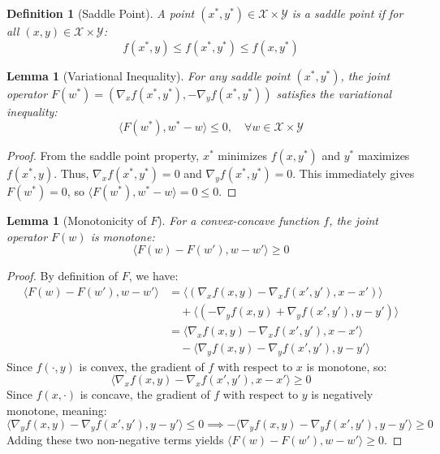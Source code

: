 \documentclass{article}
\newtheorem{lemma}[theorem]{Lemma}
\newtheorem{definition}{Definition}
\begin{document}
\begin{definition}[Saddle Point]
A point $(x^*, y^*) \in \mathcal{X} \times \mathcal{Y}$ is a saddle point if for all $(x,y) \in \mathcal{X} \times \mathcal{Y}$:
$$ f(x^*, y) \leq f(x^*, y^*) \leq f(x, y^*) $$
\end{definition}

\begin{lemma}[Variational Inequality]
For any saddle point $(x^*, y^*)$, the joint operator $F(w^*) = (\nabla_x f(x^*, y^*), -\nabla_y f(x^*, y^*))$ satisfies the variational inequality:
$$ \langle F(w^*), w^* - w \rangle \leq 0, \quad \forall w \in \mathcal{X} \times \mathcal{Y} $$
\end{lemma}

\begin{proof}
From the saddle point property, $x^*$ minimizes $f(x, y^*)$ and $y^*$ maximizes $f(x^*, y)$. Thus, $\nabla_x f(x^*, y^*) = 0$ and $\nabla_y f(x^*, y^*) = 0$. This immediately gives $F(w^*) = 0$, so $\langle F(w^*), w^* - w \rangle = 0 \leq 0$.
\end{proof}

\begin{lemma}[Monotonicity of $F$]
For a convex-concave function $f$, the joint operator $F(w)$ is monotone:
$$ \langle F(w) - F(w'), w - w' \rangle \geq 0 $$
\end{lemma}

\begin{proof}
By definition of $F$, we have:
\begin{align*}
\langle F(w) - F(w'), w - w' \rangle &= \langle (\nabla_x f(x,y) - \nabla_x f(x',y'), x - x') \rangle \\
&\quad + \langle (-\nabla_y f(x,y) + \nabla_y f(x',y'), y - y') \rangle \\
&= \langle \nabla_x f(x,y) - \nabla_x f(x',y'), x - x' \rangle \\
&\quad - \langle \nabla_y f(x,y) - \nabla_y f(x',y'), y - y' \rangle
\end{align*}
Since $f(\cdot, y)$ is convex, the gradient of $f$ with respect to $x$ is monotone, so:
$$ \langle \nabla_x f(x,y) - \nabla_x f(x',y'), x - x' \rangle \geq 0 $$
Since $f(x, \cdot)$ is concave, the gradient of $f$ with respect to $y$ is negatively monotone, meaning:
$$ \langle \nabla_y f(x,y) - \nabla_y f(x',y'), y - y' \rangle \leq 0 \implies - \langle \nabla_y f(x,y) - \nabla_y f(x',y'), y - y' \rangle \geq 0 $$
Adding these two non-negative terms yields $\langle F(w) - F(w'), w - w' \rangle \geq 0$.
\end{proof}
\end{document}
